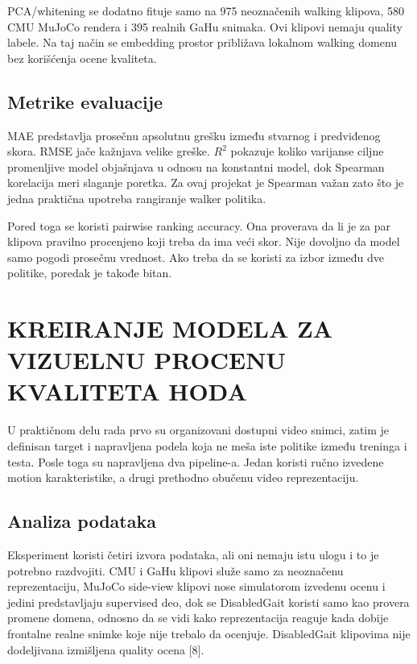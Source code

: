 ﻿\documentclass[12pt,a4paper]{report}
\begin{document}
PCA/whitening se dodatno fituje samo na 975 neoznačenih walking klipova, 580 CMU
MuJoCo rendera i 395 realnih GaHu snimaka. Ovi klipovi nemaju quality labele.
Na taj način se embedding prostor približava lokalnom walking domenu bez
korišćenja ocene kvaliteta.

\section{Metrike evaluacije}

MAE predstavlja prosečnu apsolutnu grešku između stvarnog i predviđenog skora.
RMSE jače kažnjava velike greške. $R^2$ pokazuje koliko varijanse ciljne
promenljive model objašnjava u odnosu na konstantni model, dok Spearman
korelacija meri slaganje poretka. Za ovaj projekat je Spearman važan zato što je
jedna praktična upotreba rangiranje walker politika.

Pored toga se koristi pairwise ranking accuracy. Ona proverava da li je za par
klipova pravilno procenjeno koji treba da ima veći skor. Nije dovoljno da model
samo pogodi prosečnu vrednost. Ako treba da se koristi za izbor između dve
politike, poredak je takođe bitan.

\chapter{KREIRANJE MODELA ZA VIZUELNU PROCENU KVALITETA HODA}

U praktičnom delu rada prvo su organizovani dostupni video snimci, zatim je
definisan target i napravljena podela koja ne meša iste politike između treninga
i testa. Posle toga su napravljena dva pipeline-a. Jedan koristi ručno izvedene
motion karakteristike, a drugi prethodno obučenu video reprezentaciju.

\section{Analiza podataka}

Eksperiment koristi četiri izvora podataka, ali oni nemaju istu ulogu i to je
potrebno razdvojiti. CMU i GaHu klipovi služe samo za neoznačenu reprezentaciju,
MuJoCo side-view klipovi nose simulatorom izvedenu ocenu i jedini predstavljaju
supervised deo, dok se DisabledGait koristi samo kao provera promene domena,
odnosno da se vidi kako reprezentacija reaguje kada dobije frontalne realne
snimke koje nije trebalo da ocenjuje. DisabledGait klipovima nije dodeljivana
izmišljena quality ocena [8].
\end{document}
